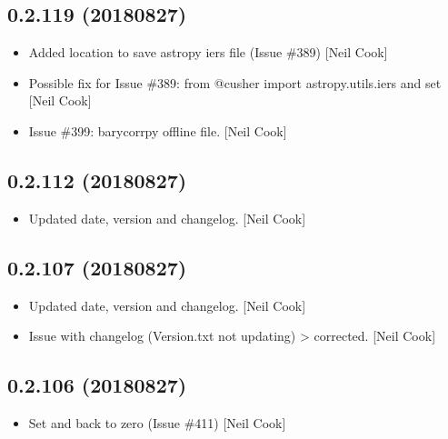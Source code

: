 \documentclass[a4paper,10pt,english]{report}
\begin{document}
\subsection{0.2.119 (2018\sphinxhyphen{}08\sphinxhyphen{}27)}
\label{\detokenize{misc/changelog:id368}}\begin{itemize}
\item {} 
Added location to save astropy iers file (Issue \#389) {[}Neil Cook{]}

\item {} 
Possible fix for Issue \#389: from @cusher \sphinxhyphen{} import
astropy.utils.iers and set  {[}Neil Cook{]}

\item {} 
Issue \#399: barycorrpy offline file. {[}Neil Cook{]}

\end{itemize}


\subsection{0.2.112 (2018\sphinxhyphen{}08\sphinxhyphen{}27)}
\label{\detokenize{misc/changelog:id369}}\begin{itemize}
\item {} 
Updated date, version and changelog. {[}Neil Cook{]}

\end{itemize}


\subsection{0.2.107 (2018\sphinxhyphen{}08\sphinxhyphen{}27)}
\label{\detokenize{misc/changelog:id370}}\begin{itemize}
\item {} 
Updated date, version and changelog. {[}Neil Cook{]}

\item {} 
Issue with changelog (Version.txt not updating) \textendash{}\textgreater{} corrected. {[}Neil
Cook{]}

\end{itemize}


\subsection{0.2.106 (2018\sphinxhyphen{}08\sphinxhyphen{}27)}
\label{\detokenize{misc/changelog:id371}}\begin{itemize}
\item {} 
Set  and  back to zero (Issue \#411)
{[}Neil Cook{]}

\end{itemize}
\end{document}
